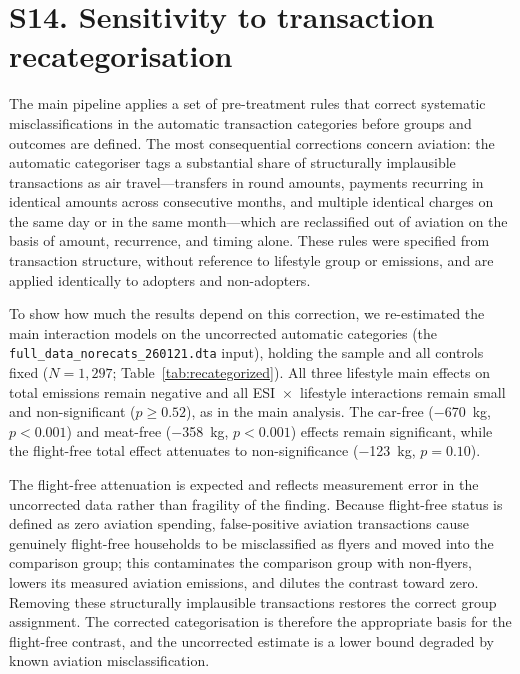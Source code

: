 \documentclass[12pt]{article}
\begin{document}
\section*{S14. Sensitivity to transaction recategorisation}
The main pipeline applies a set of pre-treatment rules that correct systematic misclassifications in the automatic transaction categories before groups and outcomes are defined. The most consequential corrections concern aviation: the automatic categoriser tags a substantial share of structurally implausible transactions as air travel---transfers in round amounts, payments recurring in identical amounts across consecutive months, and multiple identical charges on the same day or in the same month---which are reclassified out of aviation on the basis of amount, recurrence, and timing alone. These rules were specified from transaction structure, without reference to lifestyle group or emissions, and are applied identically to adopters and non-adopters.

To show how much the results depend on this correction, we re-estimated the main interaction models on the uncorrected automatic categories (the \texttt{full\_data\_norecats\_260121.dta} input), holding the sample and all controls fixed ($N=1{,}297$; Table~\ref{tab:recategorized}). All three lifestyle main effects on total emissions remain negative and all ESI~$\times$~lifestyle interactions remain small and non-significant ($p\geq0.52$), as in the main analysis. The car-free ($-$670~kg, $p<0.001$) and meat-free ($-$358~kg, $p<0.001$) effects remain significant, while the flight-free total effect attenuates to non-significance ($-$123~kg, $p=0.10$).

The flight-free attenuation is expected and reflects measurement error in the uncorrected data rather than fragility of the finding. Because flight-free status is defined as zero aviation spending, false-positive aviation transactions cause genuinely flight-free households to be misclassified as flyers and moved into the comparison group; this contaminates the comparison group with non-flyers, lowers its measured aviation emissions, and dilutes the contrast toward zero. Removing these structurally implausible transactions restores the correct group assignment. The corrected categorisation is therefore the appropriate basis for the flight-free contrast, and the uncorrected estimate is a lower bound degraded by known aviation misclassification.
\end{document}
